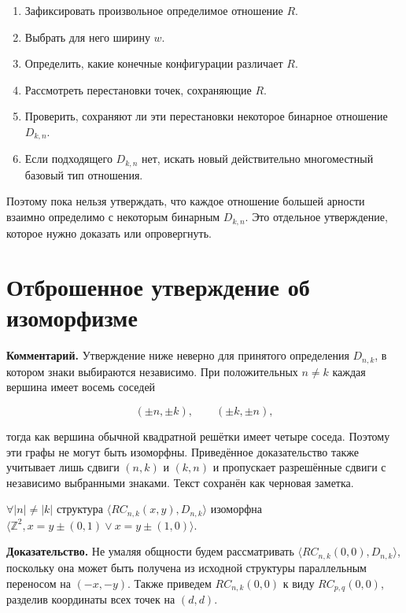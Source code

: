\begin{enumerate}
\def\labelenumi{\arabic{enumi}.}
\tightlist
\item
  Зафиксировать произвольное определимое отношение $R$.
\item
  Выбрать для него ширину $w$.
\item
  Определить, какие конечные конфигурации различает $R$.
\item
  Рассмотреть перестановки точек, сохраняющие $R$.
\item
  Проверить, сохраняют ли эти перестановки некоторое бинарное отношение
  $D_{k,n}$.
\item
  Если подходящего $D_{k,n}$ нет, искать новый действительно многоместный
  базовый тип отношения.
\end{enumerate}

Поэтому пока нельзя утверждать, что каждое отношение большей арности взаимно
определимо с некоторым бинарным $D_{k,n}$. Это отдельное утверждение, которое
нужно доказать или опровергнуть.


\section{Отброшенное утверждение об изоморфизме}

\textbf{Комментарий.}
Утверждение ниже неверно для принятого определения $D_{n,k}$, в котором знаки
выбираются независимо. При положительных $n\ne k$ каждая вершина имеет восемь
соседей

$$
(\pm n,\pm k),\qquad(\pm k,\pm n),
$$

тогда как вершина обычной квадратной решётки имеет четыре соседа. Поэтому эти
графы не могут быть изоморфны. Приведённое доказательство также учитывает лишь
сдвиги $(n,k)$ и $(k,n)$ и пропускает разрешённые сдвиги с независимо
выбранными знаками. Текст сохранён как черновая заметка.

\begin{theorem}
    $\forall |n| \neq |k|$ структура $\langle RC_{n,k}(x,y), D_{n,k}\rangle$ изоморфна $\langle \mathbb{Z}^2, x = y \pm (0, 1) \vee x = y \pm (1, 0)\rangle$.
\end{theorem}

\textbf{Доказательство.}
Не умаляя общности будем рассматривать $\langle RC_{n,k}(0,0), D_{n,k}\rangle$, поскольку она может быть получена из исходной структуры параллельным переносом на $(-x,-y)$.
Также приведем $RC_{n,k}(0,0)$ к виду $RC_{p,q}(0,0)$, разделив координаты всех точек на $(d,d)$.

